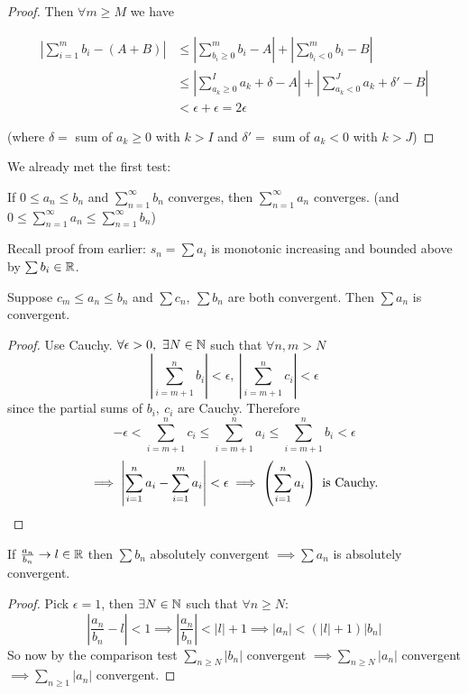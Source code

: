 \documentclass[10pt,twoside]{scrartcl}
\begin{document}
\begin{proof}
Then $\forall m \geq M$ we have

\begin{align*}
\left|\sum_{i=1}^m b_i - (A+B)\right| 
&\leq \left|\sum_{b_i \geq 0}^m b_i - A\right| + \left|\sum_{b_i < 0}^m b_i - B\right|\\
&\leq \left|\sum_{a_k \geq 0}^I a_k + \delta - A\right| + \left|\sum_{a_k < 0}^J a_k +\delta' - B\right|\\
&< \epsilon + \epsilon = 2\epsilon 
\end{align*}

(where $\delta =$ sum of $a_k \geq 0$ with $k >I$ and $\delta' =$ sum of $a_k < 0$ with $k > J$) \end{proof}


\setcounter{equation}{4}
We already met the first test:
\begin{theorem}[Comparison I]
If $0 \leq a_n \leq b_n$ and $\sum_{n=1}^{\infty} b_n$ converges, then $\sum_{n=1}^{\infty} a_n$ converges.	 (and $0 \leq \sum_{n=1}^{\infty}a_n \leq \sum_{n=1}^{\infty}b_n$)
\end{theorem}

Recall proof from earlier: $s_n = \sum a_i$ is monotonic increasing and bounded above by $\sum b_i \in \mathbb{R}$.\\

\setcounter{equation}{17}
\begin{theorem}
	Suppose $c_m \leq a_n \leq b_n$ and $\sum c_n,~\sum b_n$ are both convergent. Then $\sum a_n$ is convergent.
\end{theorem}
\begin{proof}
Use Cauchy. $\forall \epsilon >0,~ \exists N \in \mathbb{N}$ such that $\forall n,m > N$
\[\left|\sum_{i=m+1}^n b_i\right| < \epsilon,~\left|\sum_{i=m+1}^n c_i\right| < \epsilon\] since the partial sums of $b_i,~c_i$ are Cauchy. Therefore
\[-\epsilon <\sum_{i=m+1}^n c_i \leq \sum_{i=m+1}^n a_i \leq \sum_{i=m+1}^n b_i < \epsilon   \]
\[\implies \left|\sum_{i=1}^{n} a_i - \sum_{i=1}^m a_i\right| < \epsilon \implies \left(\sum_{i=1}^{n} a_i \right) \text{ is Cauchy.} \qedhere\]
\end{proof}\vspace*{5pt}

\begin{theorem}
If   $\frac{a_n}{b_n}\to l \in \mathbb{R}$ then $\sum b_n$ absolutely convergent $\implies \sum a_n$ is absolutely convergent.
\end{theorem}
\begin{proof}
Pick $\epsilon = 1$, then $\exists N \in \mathbb{N}$ such that $\forall n \geq N$:
\[\left|\frac{a_n}{b_n} - l \right| < 1 \implies \left|\frac{a_n}{b_n}\right| < |l| + 1 \implies |a_n| < (|l| + 1)|b_n|\]
So now by the comparison test $\sum_{n \geq N} |b_n|$ convergent $\implies \sum_{n \geq N} |a_n|$ convergent $\implies \sum_{n\geq 1} |a_n|$ convergent. 	
\end{proof}
\end{document}
